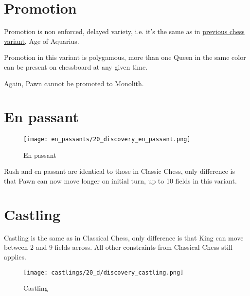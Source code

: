 \clearpage %

\section*{Promotion}

Promotion is non enforced, delayed variety, i.e. it's the same as in
\hyperref[sec:Age of Aquarius/Promotion]{previous chess variant}, Age of Aquarius.

Promotion in this variant is polygamous, more than one Queen in the same color
can be present on chessboard at any given time.

Again, Pawn cannot be promoted to Monolith.

\clearpage %

\section*{En passant}

\noindent
\begin{wrapfigure}{l}{0.4\textwidth}
\centering
\texttt{[image: en\_passants/20\_discovery\_en\_passant.png]}
\caption{En passant}
\label{fig:20_discovery_en_passant}
\end{wrapfigure}
Rush and en passant are identical to those in Classic Chess, only difference
is that Pawn can now move longer on initial turn, up to 10 fields in this
variant.

\clearpage %

\section*{Castling}

Castling is the same as in Classical Chess, only difference is that King can move between 2 and 9 fields across.
All other constraints from Classical Chess still applies.

\noindent
\begin{figure}[!h]
\texttt{[image: castlings/20\_d/discovery\_castling.png]}
\caption{Castling}
\label{fig:discovery_castling}
\end{figure}

